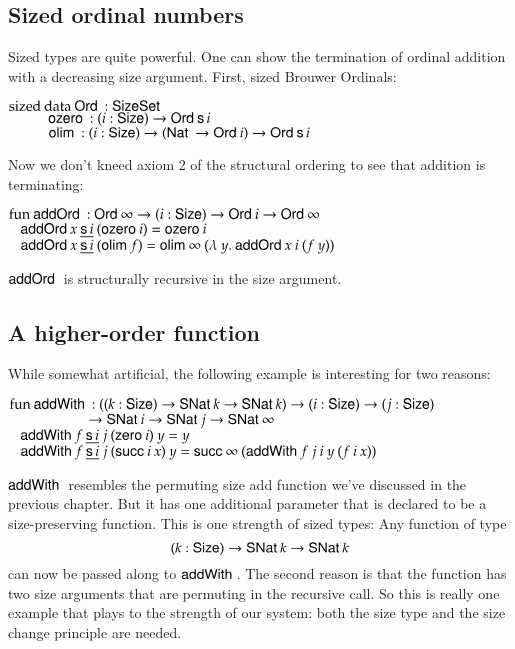 \subsection{Sized ordinal numbers}
Sized types are quite powerful. 
One can show the termination of ordinal addition with a decreasing size argument.
First, sized Brouwer Ordinals:
\begin{bsp}
$\mathrm{sized}\: \mathrm{data}\: \mathsf{Ord}\: : \mathsf{Size} \mathsf{Set}$ \\
$\spcx \ozero : (i : \Size ) \ra \Ord \s i $\\
$\spcx \olim : ( i : \Size ) \ra (\Nat \ra \Ord i) \ra \Ord \s i $
\end{bsp}
Now we don't kneed axiom 2 of the structural ordering to see that addition is terminating:
\begin{bsp}
$\mathrm{fun}\: \mathsf{addOrd}\: : \mathsf{Ord}\: \infty \rightarrow ( i : \mathsf{Size} ) \rightarrow{\mathsf{Ord}\:i \rightarrow\mathsf{Ord}\:\infty }$\\
$\hspace*{3mm} \mathsf{addOrd}\: x\: \underline{\mathsf{s}\, i}\: (\mathsf{ozero}\: i) = \mathsf{ozero}\: i $\\
$\hspace*{3mm} \mathsf{addOrd}\: x\: \underline{\mathsf{s}\, i}\: (\mathsf{olim}\: f)  = \mathsf{olim}\: \infty \: ( \lambda\: y .\: \mathsf{addOrd}\:  x \: i \: (f \: y))  $
\end{bsp}
$\mathsf{addOrd}\:$ is structurally recursive in the size argument.
\subsection{A higher-order function}
While somewhat artificial, the following example is interesting for two reasons:
\begin{bsp}
$\mathrm{fun}\: \mathsf{addWith}\: : ((k : \mathsf{Size} ) \rightarrow \mathsf{SNat}\: k \rightarrow \mathsf{SNat}\: k ) \rightarrow (i : \mathsf{Size} ) \rightarrow (j : \mathsf{Size} ) $\\
$\spcx \spcx \ra  \SNat i \ra \SNat j \ra \SNat \infty $\\
$\hspace*{3mm} \mathsf{addWith}\: f \: \underline{\mathsf{s}\, i} \: j \: (\mathsf{zero}\: i) \: y = y $ \\
$\hspace*{3mm} \mathsf{addWith}\: f \: \underline{\mathsf{s}\, i} \: j \: (\mathsf{succ}\: i \: x) \: y = \mathsf{succ}\: \infty \: (\mathsf{addWith}\: f \: j \: i \: y \: (f \: i \: x))$
\end{bsp}
$\mathsf{addWith}\:$ resembles the permuting size add function we've discussed in the previous chapter.
But it has one additional parameter that is declared to be a size-preserving function.
This is one strength of sized types: Any function of type 
\[ (k : \mathsf{Size} ) \rightarrow \mathsf{SNat}\: k \rightarrow \mathsf{SNat}\: k \]
can now be passed along to $\mathsf{addWith}\:$.
The second reason is that the function has two size arguments that are permuting in the recursive call. 
So this is really one example that plays to the strength of our system: both the size type and the size change principle are needed.

